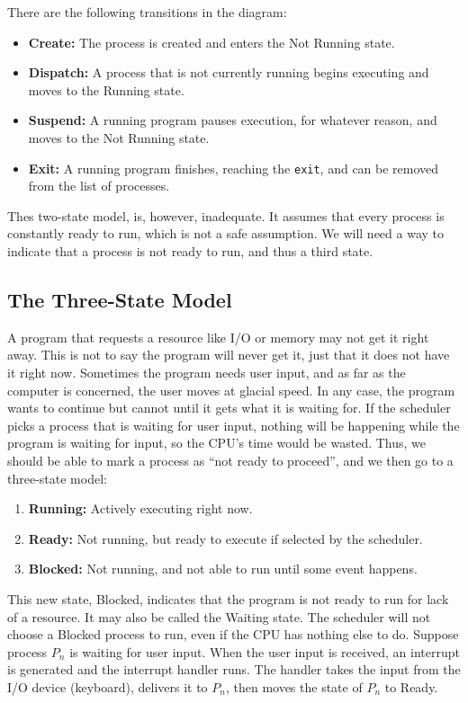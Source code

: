 There are the following transitions in the diagram:
\begin{itemize}
	\item \textbf{Create:} The process is created and enters the Not Running state.
	\item \textbf{Dispatch:} A process that is not currently running begins executing and moves to the Running state.
	\item \textbf{Suspend:} A running program pauses execution, for whatever reason, and moves to the Not Running state.
	\item \textbf{Exit:} A running program finishes, reaching the \texttt{exit}, and can be removed from the list of processes.
\end{itemize}


Thes two-state model, is, however, inadequate. It assumes that every process is constantly ready to run, which is not a safe assumption. We will need a way to indicate that a process is not ready to run, and thus a third state.

\subsection*{The Three-State Model}

A program that requests a resource like I/O or memory may not get it right away. This is not to say the program will never get it, just that it does not have it right now. Sometimes the program needs user input, and as far as the computer is concerned, the user moves at glacial speed. In any case, the program wants to continue but cannot until it gets what it is waiting for.  If the scheduler picks a process that is waiting for user input, nothing will be happening while the program is waiting for input, so the CPU's time would be wasted. Thus, we should be able to mark a process as ``not ready to proceed'', and we then go to a three-state model:

\begin{enumerate}
 \item \textbf{Running:} Actively executing right now.
 \item \textbf{Ready:} Not running, but ready to execute if selected by the scheduler.
 \item \textbf{Blocked:} Not running, and not able to run until some event happens.
\end{enumerate}

This new state, Blocked, indicates that the program is not ready to run for lack of a resource. It may also be called the Waiting state. The scheduler will not choose a Blocked process to run, even if the CPU has nothing else to do. Suppose process $P_{n}$ is waiting for user input. When the user input is received, an interrupt is generated and the interrupt handler runs. The handler takes the input from the I/O device (keyboard), delivers it to $P_{n}$, then moves the state of $P_{n}$ to Ready.

